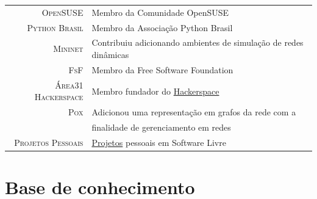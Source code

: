 \documentclass[a4paper,10pt]{article} %
\begin{document}
\begin{tabular}{rl}
\textsc{OpenSUSE}  & Membro da Comunidade OpenSUSE \\
\textsc{Python Brasil}  & Membro da Associação Python Brasil \\
\textsc{Mininet}  & Contribuiu adicionando ambientes de simulação de redes
dinâmicas \\
\textsc{FsF} & Membro da Free Software Foundation \\
\textsc{Área31 Hackerspace} & Membro fundador do
\href{http://area31.net.br}{Hackerspace} \\
\textsc{Pox} & Adicionou uma representação em grafos da rede com a
\\ & finalidade de gerenciamento em redes \\
\textsc{Projetos Pessoais} & \href{http://github.com/pantuza}{Projetos}
pessoais em Software Livre \\
\end{tabular}













\section{Base de conhecimento}
\end{document}
